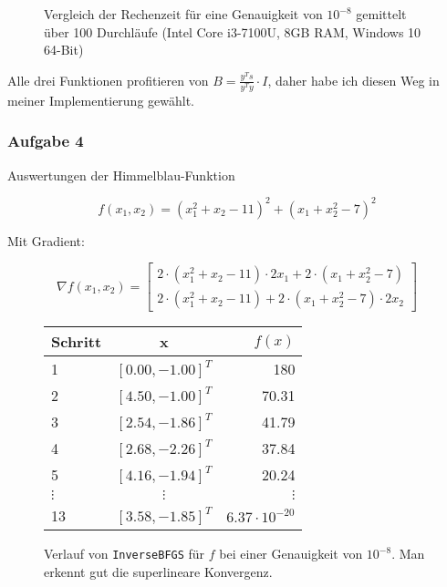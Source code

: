 \documentclass[a4paper, 12pt]{report}
\begin{document}
\begin{figure}[H]
\begin{minipage}{.3\textwidth}
  \end{minipage}
  \caption{Vergleich der Rechenzeit für eine Genauigkeit von $10^{-8}$ gemittelt über 100 Durchläufe (Intel Core i3-7100U, 8GB RAM, Windows 10 64-Bit)}
\end{figure}

Alle drei Funktionen profitieren von $B = \frac{y^Ts}{y^Ty}\cdot I$, daher habe ich diesen Weg in meiner Implementierung gewählt.

\subsubsection{Aufgabe 4}

Auswertungen der Himmelblau-Funktion

$$f(x_1, x_2) = (x_1^2 + x_2 - 11)^2 + (x_1 + x_2^2 - 7)^2$$

Mit Gradient:

\def\arraystretch{1.25}
$$\nabla f(x_1, x_2) = \begin{bmatrix} 2\cdot(x_1^2 + x_2 - 11)\cdot 2x_1 + 2\cdot(x_1 + x_2^2 - 7) \\ 
                2\cdot (x_1^2 + x_2 - 11) + 2\cdot(x_1 + x_2^2 - 7)\cdot 2x_2 \end{bmatrix}$$

\begin{figure}[H]
  \centering
  \def\arraystretch{1.25}
  \begin{tabular}{l|c|r}
    \hline
    \textbf{Schritt} & \textbf{x} & \textbf{$f(x)$}\\
    \hline
    1 & $[0.00, -1.00]^T$ & 180\\
    2 & $[4.50, -1.00]^T$ & 70.31\\
    3 & $[2.54, -1.86]^T$ & 41.79\\
    4 & $[2.68, -2.26]^T$ & 37.84\\
    5 & $[4.16, -1.94]^T$ & 20.24\\
    $\vdots$ & $\vdots$ & $\vdots$\\
    13 & $[3.58, -1.85]^T$ & $6.37 \cdot 10^{-20}$\\
    \hline
  \end{tabular}
  \caption{Verlauf von \lstinline[basicstyle=\ttfamily\color{black}]|InverseBFGS| für $f$ bei einer Genauigkeit von $10^{-8}$. Man erkennt
  gut die superlineare Konvergenz.}
\end{figure}
\end{document}
